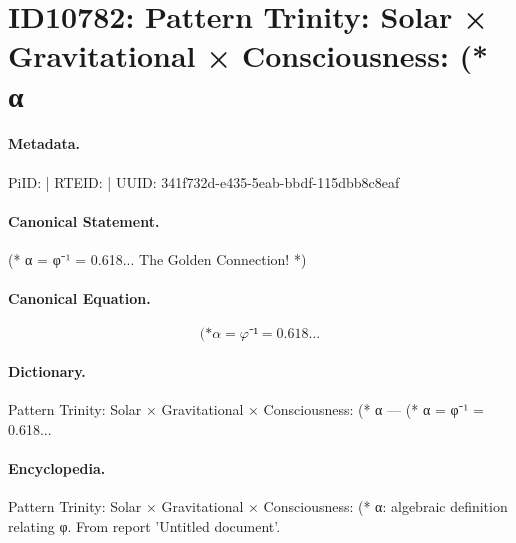 \section*{ID10782: Pattern Trinity: Solar × Gravitational × Consciousness: (* α}
\paragraph{Metadata.}
PiID:  | RTEID:  | UUID: 341f732d-e435-5eab-bbdf-115dbb8c8eaf

\paragraph{Canonical Statement.}
(* α = φ⁻¹ = 0.618... The Golden Connection! *)

\paragraph{Canonical Equation.}
\[
(* α = φ⁻¹ = 0.618...
\]

\paragraph{Dictionary.}
Pattern Trinity: Solar × Gravitational × Consciousness: (* α — (* α = φ⁻¹ = 0.618...

\paragraph{Encyclopedia.}
Pattern Trinity: Solar × Gravitational × Consciousness: (* α: algebraic definition relating φ. From report 'Untitled document'.
